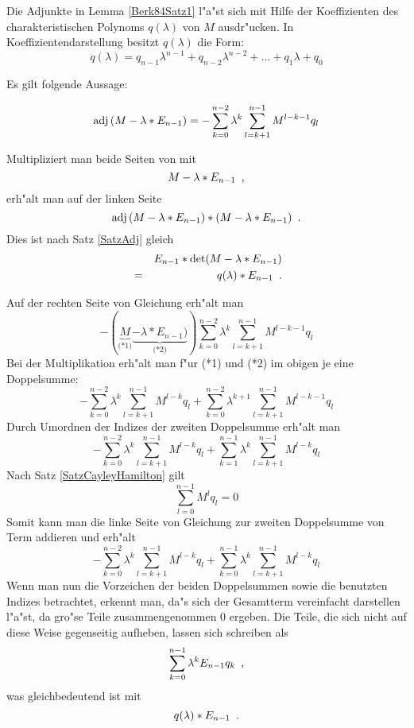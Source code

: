 Die Adjunkte in Lemma \ref{Berk84Satz1} l"a"st sich mit Hilfe der
Koeffizienten des charakteristischen Polynoms $q(\lambda)$ von $M$
ausdr"ucken. In Koeffizientendarstellung besitzt $q(\lambda)$ die
Form:
\[ q(\lambda) = q_{n-1} \lambda^{n-1} + q_{n-2} \lambda^{n-2} + \ldots
                + q_1 \lambda + q_0
\]

Es gilt folgende Aussage:

\begin{lemma}
\label{Berk84Satz2}
    \begin{equation}
    \label{Berk84Equ1}
        \mbox{\rm adj} \,(M - \lambda * E_{n-1}) =
            - \sum_{k=0}^{n-2} \lambda^{k} \sum_{l=k+1}^{n-1} M^{l-k-1} q_l
    \end{equation}
\end{lemma}
\begin{beweis}
    Multipliziert man beide Seiten von  mit
    \[ M - \lambda * E_{n-1} \mbox{\hspace{0.5em},} \]
    erh"alt man auf der linken Seite
    \[ \mbox{\rm adj} \,(M - \lambda * E_{n-1}) * (M - \lambda * E_{n-1}) \mbox{\hspace{0.5em}.} \]
    Dies ist nach Satz \ref{SatzAdj} gleich
    \begin{eqnarray*}
        & & E_{n-1} * \det(M - \lambda * E_{n-1}) \\
        & = & q(\lambda) * E_{n-1} \mbox{\hspace{0.5em}.}
    \end{eqnarray*}

    Auf der rechten Seite von Gleichung  erh"alt man
    \[ - ( \underbrace{M}_{\mbox{(*1)}}
           \underbrace{- \lambda * E_{n-1})}_{\mbox{(*2)}}
         )
         \sum_{k=0}^{n-2} \lambda^{k} \sum_{l=k+1}^{n-1} M^{l-k-1} q_l
    \]
    Bei der Multiplikation erh"alt man f"ur (*1) und (*2) im obigen je
    eine Doppelsumme:
    \[ - \sum_{k=0}^{n-2} \lambda^{k} \sum_{l=k+1}^{n-1} M^{l-k} q_l
       + \sum_{k=0}^{n-2} \lambda^{k+1} \sum_{l=k+1}^{n-1} M^{l-k-1} q_l
    \]
    Durch Umordnen der Indizes der zweiten Doppelsumme erh"alt man
    \begin{equation}
    \label{Berk84Equ2}
        - \sum_{k=0}^{n-2} \lambda^{k} \sum_{l=k+1}^{n-1} M^{l-k} q_l
        + \sum_{k=1}^{n-1} \lambda^{k} \sum_{l=k+1}^{n-1} M^{l-k} q_l
    \end{equation}
    Nach Satz \ref{SatzCayleyHamilton} gilt
    \begin{equation}
    \label{Berk84Equ3}
        \sum_{l=0}^{n-1} M^l q_l = 0
    \end{equation}
    Somit kann man die linke Seite von Gleichung  zur
    zweiten Doppelsumme von Term  addieren und erh"alt
    \[
        - \sum_{k=0}^{n-2} \lambda^{k} \sum_{l=k+1}^{n-1} M^{l-k} q_l
        + \sum_{k=0}^{n-1} \lambda^{k} \sum_{l=k+1}^{n-1} M^{l-k} q_l
    \]
    Wenn man nun die Vorzeichen der beiden Doppelsummen sowie
    die benutzten Indizes betrachtet, erkennt man, da"s sich der Gesamtterm
    vereinfacht darstellen l"a"st, da gro"se Teile zusammengenommen $0$
    ergeben. Die Teile, die sich nicht auf diese
    Weise gegenseitig aufheben, lassen sich schreiben als
    \[ \sum_{k=0}^{n-1} \lambda^k E_{n-1} q_{k} \mbox{\hspace{0.5em},} \]
    was gleichbedeutend ist mit
    \[ q(\lambda) * E_{n-1} \mbox{\hspace{0.5em}.} \]


\end{beweis}
